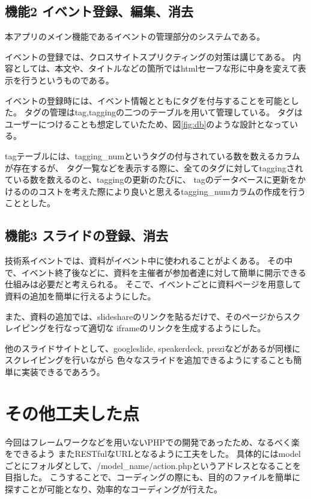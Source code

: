 \documentclass[11pt,a4j]{jsarticle}
\begin{document}
\subsection{機能2 イベント登録、編集、消去}

本アプリのメイン機能であるイベントの管理部分のシステムである。

イベントの登録では、クロスサイトスプリクティングの対策は講じてある。
内容としては、本文や、タイトルなどの箇所ではhtmlセーフな形に中身を変えて表示を行うというものである。

イベントの登録時には、イベント情報とともにタグを付与することを可能とした。
タグの管理はtag,taggingの二つのテーブルを用いて管理している。
タグはユーザーにつけることも想定していたため、図\ref{fig:db}のような設計となっている。

tagテーブルには、tagging\_numというタグの付与されている数を数えるカラムが存在するが、
タグ一覧などを表示する際に、全てのタグに対してtaggingされている数を数えるのと、taggingの更新のたびに、
tagのデータベースに更新をかけるののコストを考えた際により良いと思えるtagging\_numカラムの作成を行うこととした。

\subsection{機能3 スライドの登録、消去}

技術系イベントでは、資料がイベント中に使われることがよくある。
その中で、イベント終了後などに、資料を主催者が参加者達に対して簡単に開示できる仕組みは必要だと考えられる。
そこで、イベントごとに資料ページを用意して資料の追加を簡単に行えるようにした。

また、資料の追加では、slideshareのリンクを貼るだけで、そのページからスクレイピングを行なって適切な
iframeのリンクを生成するようにした。

他のスライドサイトとして、googleslide, speakerdeck, preziなどがあるが同様にスクレイピングを行いながら
色々なスライドを追加できるようにすることも簡単に実装できるであろう。

\section{その他工夫した点}

今回はフレームワークなどを用いないPHPでの開発であったため、なるべく楽をできるよう
またRESTfulなURLとなるように工夫をした。
具体的にはmodelごとにフォルダとして、/{model\_name}/action.phpというアドレスとなることを目指した。
こうすることで、コーディングの際にも、目的のファイルを簡単に探すことが可能となり、効率的なコーディングが行えた。
\end{document}
